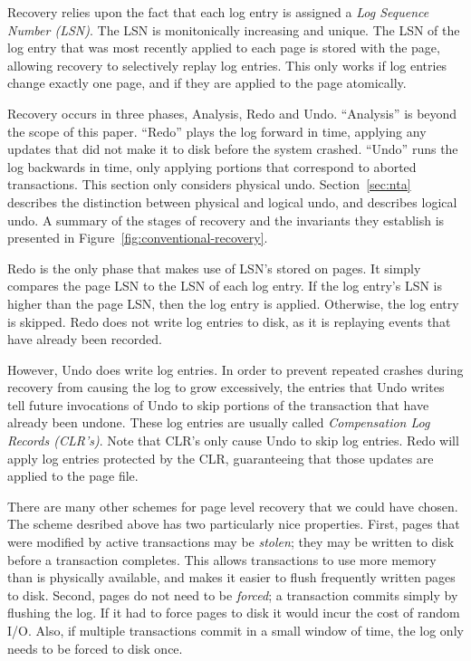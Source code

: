 \documentclass[letterpaper,twocolumn,10pt]{article}
\begin{document}
Recovery relies upon the fact that each log entry is assigned a {\em
Log Sequence Number (LSN)}.  The LSN is monitonically increasing and
unique.  The LSN of the log entry that was most recently applied to
each page is stored with the page, allowing recovery to selectively
replay log entries.  This only works if log entries change exactly one
page, and if they are applied to the page atomically.

Recovery occurs in three phases, Analysis, Redo and Undo.
``Analysis'' is beyond the scope of this paper.  ``Redo'' plays the
log forward in time, applying any updates that did not make it to disk
before the system crashed.  ``Undo'' runs the log backwards in time,
only applying portions that correspond to aborted transactions.  This
section only considers physical undo.  Section~\ref{sec:nta} describes
the distinction between physical and logical undo, and describes
logical undo.  A summary of the stages of recovery and the invariants
they establish is presented in Figure~\ref{fig:conventional-recovery}.

Redo is the only phase that makes use of LSN's stored on pages.
It simply compares the page LSN to the LSN of each log entry.  If the
log entry's LSN is higher than the page LSN, then the log entry is
applied.  Otherwise, the log entry is skipped.  Redo does not write
log entries to disk, as it is replaying events that have already been
recorded.  

However, Undo does write log entries.  In order to prevent repeated
crashes during recovery from causing the log to grow excessively, the
entries that Undo writes tell future invocations of Undo to skip
portions of the transaction that have already been undone.  These log
entries are usually called {\em Compensation Log Records (CLR's)}.
Note that CLR's only cause Undo to skip log entries.  Redo will apply
log entries protected by the CLR, guaranteeing that those updates are
applied to the page file.

There are many other schemes for page level recovery that we could
have chosen.  The scheme desribed above has two particularly nice
properties.  First, pages that were modified by active transactions
may be {\em stolen}; they may be written to disk before a transaction
completes.  This allows transactions to use more memory than is
physically available, and makes it easier to flush frequently written
pages to disk.  Second, pages do not need to be {\em forced}; a
transaction commits simply by flushing the log.  If it had to force
pages to disk it would incur the cost of random I/O.  Also, if
multiple transactions commit in a small window of time, the log only
needs to be forced to disk once.
\end{document}
